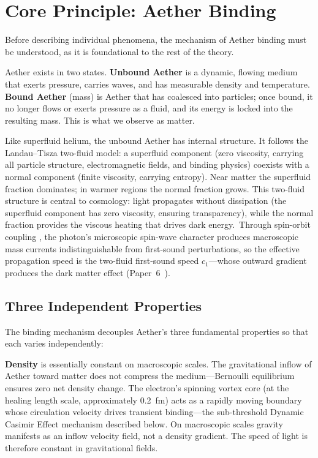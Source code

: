 \documentclass[12pt,letterpaper]{article}
\begin{document}
\section{Core Principle: Aether Binding}
\label{sec:core-binding}

Before describing individual phenomena, the mechanism of Aether binding must be understood,
as it is foundational to the rest of the theory.

Aether exists in two states.  \textbf{Unbound Aether} is a dynamic, flowing medium
that exerts pressure, carries waves, and has measurable density and temperature.
\textbf{Bound Aether} (mass) is Aether that has coalesced into particles; once bound,
it no longer flows or exerts pressure as a fluid, and its energy is locked into the
resulting mass.  This is what we observe as matter.

Like superfluid helium, the unbound Aether has internal structure.
It follows the Landau--Tisza two-fluid model:
a superfluid component (zero viscosity, carrying all particle structure,
electromagnetic fields, and binding physics) coexists with a normal
component (finite viscosity, carrying entropy).  Near matter the
superfluid fraction dominates; in warmer regions the normal fraction
grows.  This two-fluid structure is central to cosmology:
light propagates without dissipation (the superfluid component has zero viscosity,
ensuring transparency), while the normal fraction provides the viscous heating that
drives dark energy.\ Through spin-orbit coupling \cite{volovik2003}, the photon's
microscopic spin-wave character produces macroscopic mass currents indistinguishable
from first-sound perturbations, so the effective propagation speed is the two-fluid
first-sound speed $c_1$---whose outward gradient produces the dark matter effect
(Paper~6~\cite{otto-cosmology}).


\subsection{Three Independent Properties}

The binding mechanism decouples Aether's three fundamental properties
so that each varies independently:

\textbf{Density} is essentially constant on macroscopic scales.  The gravitational
inflow of Aether toward matter does not compress the medium---Bernoulli equilibrium
ensures zero net density change.  The electron's spinning vortex core
(at the healing length scale, approximately 0.2~fm) acts as a rapidly moving
boundary whose circulation velocity drives transient binding---the sub-threshold
Dynamic Casimir Effect mechanism described below.  On macroscopic scales gravity
manifests as an inflow velocity field, not a density gradient.  The speed of light
is therefore constant in gravitational fields.
\end{document}
